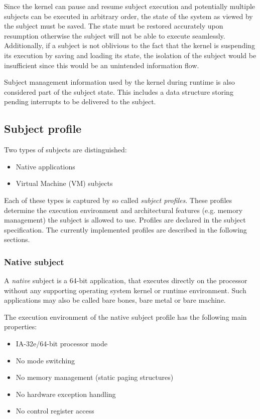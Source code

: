 Since the kernel can pause and resume subject execution and potentially multiple
subjects can be executed in arbitrary order, the state of the system as viewed
by the subject must be saved. The state must be restored accurately upon
resumption otherwise the subject will not be able to execute seamlessly.
Additionally, if a subject is not oblivious to the fact that the kernel is
suspending its execution by saving and loading its state, the isolation of the
subject would be insufficient since this would be an unintended information
flow.

Subject management information used by the kernel during runtime is also
considered part of the subject state. This includes a data structure storing
pending interrupts to be delivered to the subject.

\subsection{Subject profile}
Two types of subjects are distinguished:

\begin{itemize}
	\item Native applications
	\item Virtual Machine (VM) subjects
\end{itemize}

Each of these types is captured by so called \emph{subject
profiles}. These profiles determine the execution
environment and architectural features (e.g.  memory management) the subject is
allowed to use. Profiles are declared in the subject specification. The
currently implemented profiles are described in the following sections.

\subsubsection{Native subject}
A \emph{native} subject is a 64-bit application, that executes directly on the
processor without any supporting operating system kernel or runtime environment.
Such applications may also be called bare bones, bare metal or bare machine.

The execution environment of the native subject profile has the following main
properties:

\begin{itemize}
	\item IA-32e/64-bit processor mode
	\item No mode switching
	\item No memory management (static paging structures)
	\item No hardware exception handling
	\item No control register access
\end{itemize}

